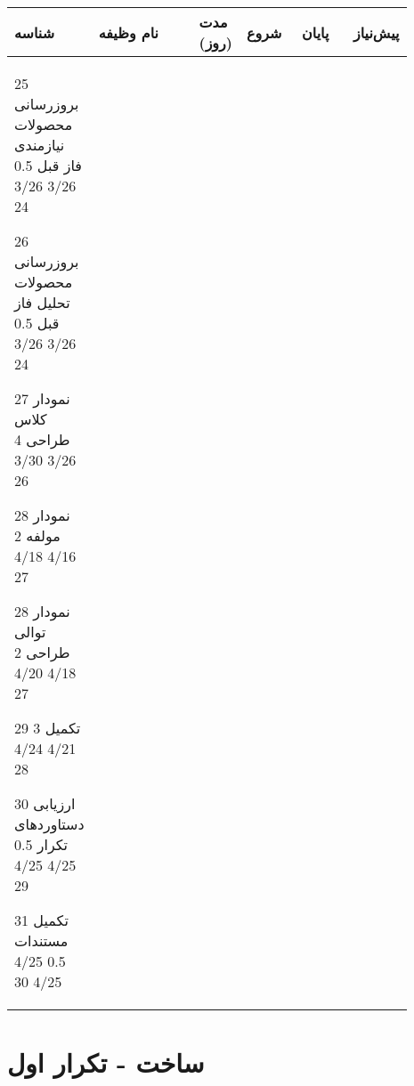 \begin{table}[h]
	\centering
	\begin{tabular}{|p{0.07\linewidth}|p{0.35\linewidth}|p{0.1\linewidth}|p{0.15\linewidth}|p{0.15\linewidth}|p{0.07\linewidth}|} 
		
		\hline
		شناسه & نام وظیفه & مدت (روز) & شروع & پایان & پیش‌نیاز\\
		\hline
		\calendarEntry
		{25}
		{بروزرسانی محصولات نیازمندی فاز قبل}
		{0.5}
		{3/26}
		{3/26}
		{24}
		
		
				\calendarEntry
		{26}
		{بروزرسانی محصولات تحلیل فاز قبل}
		{0.5}
		{3/26}
		{3/26}
		{24}



				\calendarEntry
{27}
{نمودار کلاس طراحی}
{4}
{3/26}
{3/30}
{26}

				\calendarEntry
{28}
{نمودار مولفه}
{2}
{4/16}
{4/18}
{27}

				\calendarEntry
{28}
{نمودار توالی طراحی}
{2}
{4/18}
{4/20}
{27}
		
		
						\calendarEntry
		{29}
		{تکمیل \lr{Executable Architectural Baseline}}
		{3}
		{4/21}
		{4/24}
		{28}
		
		
								\calendarEntry
		{30}
		{ارزیابی دستاوردهای تکرار}
		{0.5}
		{4/25}
		{4/25}
		{29}
		
				
		
		\calendarEntry
		{31}
		{تکمیل مستندات}
		{0.5}
		{4/25}
		{4/25}
		{30}
	\end{tabular}
\end{table}

\newpage
\section{ساخت - تکرار اول}


